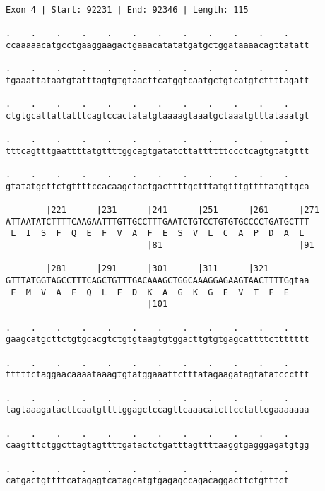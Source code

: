 \documentclass{article}
\begin{document}
\newpage
\begin{Verbatim}[fontfamily=courier]
Exon 4 | Start: 92231 | End: 92346 | Length: 115

.    .    .    .    .    .    .    .    .    .    .    .    
ccaaaaacatgcctgaaggaagactgaaacatatatgatgctggataaaacagttatatt

.    .    .    .    .    .    .    .    .    .    .    .    
tgaaattataatgtatttagtgtgtaacttcatggtcaatgctgtcatgtcttttagatt

.    .    .    .    .    .    .    .    .    .    .    .    
ctgtgcattattatttcagtccactatatgtaaaagtaaatgctaaatgtttataaatgt

.    .    .    .    .    .    .    .    .    .    .    .    
tttcagtttgaattttatgttttggcagtgatatcttattttttccctcagtgtatgttt

.    .    .    .    .    .    .    .    .    .    .    .    
gtatatgcttctgttttccacaagctactgacttttgctttatgtttgttttatgttgca

        |221      |231      |241      |251      |261      |271
ATTAATATCTTTTCAAGAATTTGTTGCCTTTGAATCTGTCCTGTGTGCCCCTGATGCTTT
 L  I  S  F  Q  E  F  V  A  F  E  S  V  L  C  A  P  D  A  L 
                            |81                           |91

        |281      |291      |301      |311      |321        
GTTTATGGTAGCCTTTCAGCTGTTTGACAAAGCTGGCAAAGGAGAAGTAACTTTTGgtaa
 F  M  V  A  F  Q  L  F  D  K  A  G  K  G  E  V  T  F  E    
                            |101                            

.    .    .    .    .    .    .    .    .    .    .    .    
gaagcatgcttctgtgcacgtctgtgtaagtgtggacttgtgtgagcattttcttttttt

.    .    .    .    .    .    .    .    .    .    .    .    
tttttctaggaacaaaataaagtgtatggaaattctttatagaagatagtatatcccttt

.    .    .    .    .    .    .    .    .    .    .    .    
tagtaaagatacttcaatgttttggagctccagttcaaacatcttcctattcgaaaaaaa

.    .    .    .    .    .    .    .    .    .    .    .    
caagtttctggcttagtagttttgatactctgatttagttttaaggtgagggagatgtgg

.    .    .    .    .    .    .    .    .    .    .    .
catgactgttttcatagagtcatagcatgtgagagccagacaggacttctgtttct
\end{Verbatim}
\newpage
\end{document}
